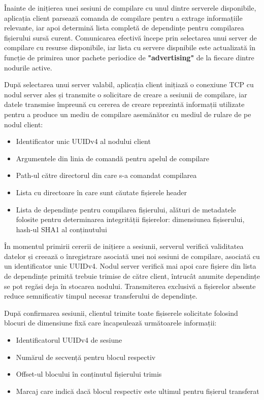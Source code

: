 Înainte de inițierea unei sesiuni de compilare cu unul dintre serverele disponibile, aplicația client parsează comanda de compilare pentru a extrage informațiile
relevante, iar apoi determină lista completă de dependințe pentru compilarea fișierului sursă curent. Comunicarea efectivă începe prin selectarea unui server de compilare
cu resurse disponibile, iar lista cu servere dispnibile este actualizată în funcție de primirea unor pachete periodice de \textbf{"advertising"} de la fiecare dintre 
nodurile active.

După selectarea unui server valabil, aplicația client inițiază o conexiune TCP cu nodul server ales și transmite o solicitare de creare a sesiunii de compilare, iar 
datele transmise împreună cu cererea de creare reprezintă informații utilizate pentru a produce un mediu de compilare asemănător cu mediul de rulare de pe nodul client:

\begin{itemize}
    \item Identificator unic UUIDv4 al nodului client
    \item Argumentele din linia de comandă pentru apelul de compilare
    \item Path-ul către directorul din care s-a comandat compilarea
    \item Lista cu directoare în care sunt căutate fișierele header
    \item Lista de dependințe pentru compilarea fișierului, alături de metadatele folosite pentru
    determinarea integrității fișierelor: dimensiunea fișiserului, hash-ul SHA1 al conținutului
\end{itemize}


În momentul primirii cererii de inițiere a sesiunii, serverul verifică validitatea datelor și creează o înregistrare asociată unei noi sesiuni de compilare,
asociată cu un identificator unic UUIDv4. Nodul server verifică mai apoi care fișiere din lista de dependințe primită trebuie trimise de către client, întrucât anumite
dependințe se pot regăsi deja în stocarea nodului. Transmiterea exclusivă a fișierelor absente reduce semnificativ timpul necesar transferului de dependințe.

După confirmarea sesiunii, clientul trimite toate fișiserele solicitate folosind blocuri de dimensiune fixă care încapsulează următoarele informații:

\begin{itemize}
    \item Identificatorul UUIDv4 de sesiune
    \item Numărul de secvență pentru blocul respectiv
    \item Offset-ul blocului în conținutul fișierului trimis
    \item Marcaj care indică dacă blocul respectiv este ultimul pentru fișierul transferat
\end{itemize}

